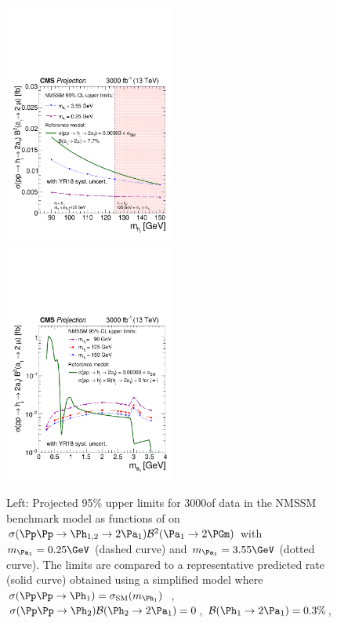\begin{figure}
\includegraphics[width=0.5\textwidth]{plots/nmssm_plots_scenario_2/CSxBR_NMSSM_vs_mh_3000.pdf}
\includegraphics[width=0.5\textwidth, clip, trim=0cm 0cm 0cm 0cm]{plots/nmssm_plots_scenario_2/CSxBR_vs_ma_3000.pdf}
\caption{Left: Projected 95\% \CL upper limits for 3000\fbinv of data in the NMSSM benchmark model as functions of \MPhOneTwo on ${\sigma(\Pp\Pp \to \PhOneTwo \to 2 \PaOne) \mathcal{B}^2(\PaOne \to 2 \PGm)}$ with $\MPaOne=0.25\GeV$ (dashed curve)
and $\MPaOne=3.55\GeV$ (dotted curve).
The limits are compared to a representative predicted rate (solid curve) obtained using a simplified model where
$\sigma (\Pp\Pp \to \PhOne)=\sigma_\mathrm{SM}(\MPhOne)$~\cite{Dittmaier:2011ti},
${\sigma (\Pp\Pp \to \PhTwo) \mathcal{B}(\PhTwo \to 2 \PaOne) = 0}$, $\mathcal{B}(\PhOne \to 2 \PaOne) = 0.3\%$,
}
\end{figure}
